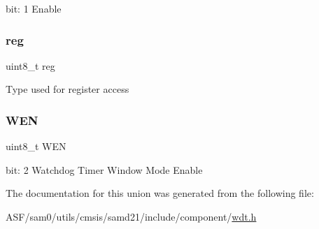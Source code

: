 bit\+: 1 Enable \mbox{\label{union_w_d_t___c_t_r_l___type_a9428adc9af4653a2050e2536b55dec8d}} 
\subsubsection{\texorpdfstring{reg}{reg}}
{\footnotesize\ttfamily uint8\+\_\+t reg}

Type used for register access \mbox{\label{union_w_d_t___c_t_r_l___type_ab03c9121a6cce6a348185dadc8c2746d}} 
\subsubsection{\texorpdfstring{WEN}{WEN}}
{\footnotesize\ttfamily uint8\+\_\+t W\+EN}

bit\+: 2 Watchdog Timer Window Mode Enable 

The documentation for this union was generated from the following file\+:\begin{DoxyCompactItemize}
\item 
A\+S\+F/sam0/utils/cmsis/samd21/include/component/\mbox{\hyperlink{component_2wdt_8h}{wdt.\+h}}\end{DoxyCompactItemize}
